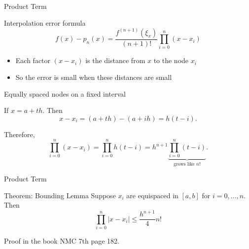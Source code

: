 \documentclass[10pt]{beamer}
\begin{document}

\begin{frame}{Product Term}

\begin{block}{Interpolation error formula}
\[
f(x)-p_n(x)=\frac{f^{(n+1)}(\xi_x)}{(n+1)!}\prod_{i=0}^n (x-x_i)
\]
\end{block}

\pause


\pause

\begin{itemize}
    \item Each factor $(x-x_i)$ is the distance from $x$ to the node $x_i$
    \item So the error is small when these distances are small
\end{itemize}
\end{frame}

\begin{frame}{Equally spaced nodes on a fixed interval}

{
}
\pause

If $x=a+th$. Then
\[
x-x_i=(a+th)-(a+ih)=h(t-i).
\]

\pause

Therefore,
\[
\prod_{i=0}^n (x-x_i)
=
\prod_{i=0}^n h(t-i)
=
h^{n+1}\underbrace{\prod_{i=0}^n (t-i)}_{\text{grows like }n!}.
\]
\end{frame}
\begin{frame}{Product Term}

\begin{block}{Theorem: Bounding Lemma}
Suppose $x_i$ are equispaced in $[a,b]$ for $i=0,\dots,n$.  Then
\begin{equation*}
  \prod_{i=0}^n |x-x_i| \leq \frac{h^{n+1}}{4} n!
\end{equation*}
\end{block}
Proof in the book NMC 7th page 182.\\[2mm]


    
\end{frame}
\end{document}

